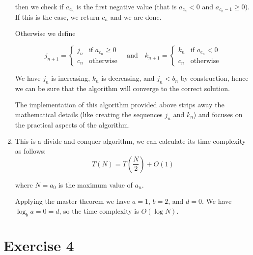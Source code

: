\documentclass[10pt]{article}
\begin{document}
\begin{enumerate}
          then we check if $a_{c_n}$ is the first negative value (that is $a_{c_n} < 0$ and $a_{c_n - 1} \geq 0$).
          If this is the case, we return $c_n$ and we are done.

          Otherwise we define

          $$
              j_{n+1}=
              \begin{cases}
                  j_n & \text{if } a_{c_n} \geq 0 \\
                  c_n & \text{otherwise}
              \end{cases}
              \quad \text{and} \quad
              k_{n+1}=
              \begin{cases}
                  k_n & \text{if } a_{c_n} < 0 \\
                  c_n & \text{otherwise}
              \end{cases}
          $$

          We have $j_n$ is increasing, $k_n$ is decreasing, and $j_n < b_n$ by construction,
          hence we can be sure that the algorithm will converge to the correct solution.

          The implementation of this algorithm provided above strips away the mathematical details (like creating the sequences $j_n$ and $k_n$)
          and focuses on the practical aspects of the algorithm.

    \item This is a divide-and-conquer algorithm, we can calculate its time complexity as follows:
          $$
              T(N) = T\left(\frac{N}{2}\right) + O(1)
          $$

          where $N = a_0$ is the maximum value of $a_n$.

          Applying the master theorem we have $a = 1$, $b = 2$, and $d = 0$.
          We have $\log_b a = 0 = d$, so the time complexity is $O(\log N)$.
\end{enumerate}

\section*{Exercise 4}
\end{document}
